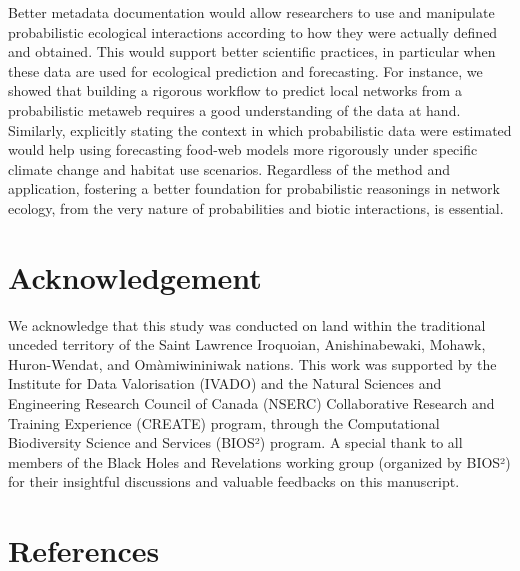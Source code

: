 \documentclass[10pt,oneside]{article}
\begin{document}
Better metadata documentation would allow researchers to use and
manipulate probabilistic ecological interactions according to how they
were actually defined and obtained. This would support better scientific
practices, in particular when these data are used for ecological
prediction and forecasting. For instance, we showed that building a
rigorous workflow to predict local networks from a probabilistic metaweb
requires a good understanding of the data at hand. Similarly, explicitly
stating the context in which probabilistic data were estimated would
help using forecasting food-web models more rigorously under specific
climate change and habitat use scenarios. Regardless of the method and
application, fostering a better foundation for probabilistic reasonings
in network ecology, from the very nature of probabilities and biotic
interactions, is essential.

\hypertarget{acknowledgement}{%
\section{Acknowledgement}\label{acknowledgement}}

We acknowledge that this study was conducted on land within the
traditional unceded territory of the Saint Lawrence Iroquoian,
Anishinabewaki, Mohawk, Huron-Wendat, and Omàmiwininiwak nations. This
work was supported by the Institute for Data Valorisation (IVADO) and
the Natural Sciences and Engineering Research Council of Canada (NSERC)
Collaborative Research and Training Experience (CREATE) program, through
the Computational Biodiversity Science and Services (BIOS²) program. A
special thank to all members of the Black Holes and Revelations working
group (organized by BIOS²) for their insightful discussions and valuable
feedbacks on this manuscript.

\hypertarget{references}{%
\section*{References}\label{references}}
\end{document}
